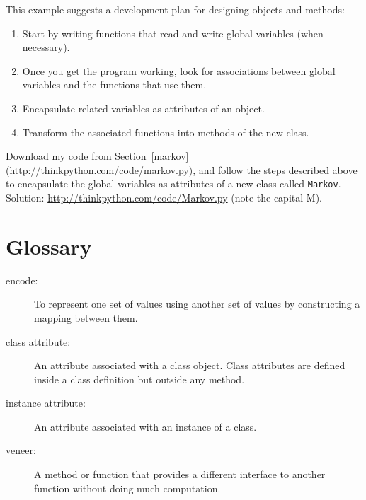 \documentclass[10pt]{book}
\begin{document}
\begin{CJK}{UTF8}{gbsn}
This example suggests a development plan for designing objects and
methods:

\begin{enumerate}

\item Start by writing functions that read and write global
variables (when necessary).

\item Once you get the program working, look for associations
between global variables and the functions that use them.

\item Encapsulate related variables as attributes of an object.

\item Transform the associated functions into methods of the new
class.

\end{enumerate}


\begin{exercise}

Download my code from Section~\ref{markov}
(\url{http://thinkpython.com/code/markov.py}), and follow the steps described
above to encapsulate the global variables as attributes of a new class
called {\tt Markov}.  Solution: \url{http://thinkpython.com/code/Markov.py}
(note the capital M).

\end{exercise}




\section{Glossary}

\begin{description}

\item[encode:]  To represent one set of values using another
set of values by constructing a mapping between them.

\item[class attribute:] An attribute associated with a class
object.  Class attributes are defined inside
a class definition but outside any method.

\item[instance attribute:] An attribute associated with an
instance of a class.

\item[veneer:] A method or function that provides a different
interface to another function without doing much computation.


\end{description}
\end{CJK}
\end{document}
